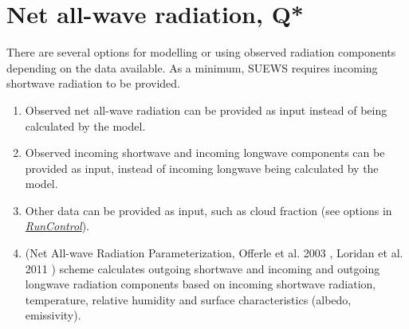 \documentclass[letterpaper,10pt,english]{sphinxmanual}
\begin{document}
\section{Net all-wave radiation, Q*}
\label{\detokenize{parameterisations-and-sub-models:net-all-wave-radiation-q}}
There are several options for modelling or using observed radiation
components depending on the data available. As a minimum, SUEWS requires
incoming shortwave radiation to be provided.
\begin{enumerate}
\item {} 
Observed net all-wave radiation can be provided as input instead of
being calculated by the model.

\item {} 
Observed incoming shortwave and incoming longwave components can be
provided as input, instead of incoming longwave being calculated by
the model.

\item {} 
Other data can be provided as input, such as cloud fraction (see
options in {\hyperref[\detokenize{parameterisations-and-sub-models:RunControl.nml}]{\emph{RunControl}}}).

\item {} 
 (Net All-wave Radiation Parameterization, Offerle et al.
2003 \label{\detokenize{parameterisations-and-sub-models:id1}}{\hyperref[\detokenize{references:o2003}]{\sphinxcrossref{{[}O2003{]}}}} , Loridan et al. 2011 \label{\detokenize{parameterisations-and-sub-models:id2}}{\hyperref[\detokenize{references:l2011}]{\sphinxcrossref{{[}L2011{]}}}} ) scheme calculates outgoing
shortwave and incoming and outgoing longwave radiation components
based on incoming shortwave radiation, temperature, relative humidity
and surface characteristics (albedo, emissivity).

\end{enumerate}
\end{document}
